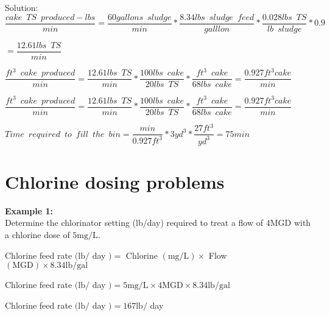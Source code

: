 \begin{enumerate}[1.]
Solution:\\
\vspace{0.2cm}
{$\dfrac{cake \enspace TS \enspace produced - lbs}{min}= \dfrac {60 gallons \enspace sludge}{min}*\dfrac {8.34 lbs \enspace sludge \enspace feed}{galllon}*\dfrac{0.028 lbs \enspace TS}{lb \enspace sludge}*0.9$}\\
\vspace{3mm}

{$=\dfrac{12.61lbs \enspace TS}{min}$}\\
\vspace{3mm}

{$\dfrac{ft^3 \enspace cake \enspace produced}{min}=\dfrac{12.61lbs \enspace TS}{min}*\dfrac{100 lbs \enspace cake}{20lbs \enspace TS}*\dfrac{ft^3 \enspace cake}{68 lbs \enspace cake} = \dfrac{0.927ft^3 cake}{min}$}\\
\vspace{3mm}

{$\dfrac{ft^3 \enspace cake \enspace produced}{min}=\dfrac{12.61lbs \enspace TS}{min}*\dfrac{100 lbs \enspace cake}{20lbs \enspace TS}*\dfrac{ft^3 \enspace cake}{68 lbs \enspace cake} = \dfrac{0.927ft^3 cake}{min}$}\\
\vspace{3mm}

{$Time \enspace required \enspace to \enspace fill \enspace the \enspace bin=\dfrac{min}{0.927ft^3}*{3yd^3}*\dfrac{27ft^3}{yd^3}=\boxed{75min}$}\\


\end{enumerate}

\section{Chlorine dosing problems}
\textbf{Example 1:}\\
Determine the chlorinator setting (lb/day) required to treat a flow of $4 \mathrm{MGD}$ with a chlorine dose of $5 \mathrm{mg} / \mathrm{L}$.

Chlorine feed rate $(\mathrm{lb} /$ day $)=$ Chlorine $(\mathrm{mg} / \mathrm{L}) \times$ Flow $(\mathrm{MGD}) \times 8.34 \mathrm{lb} / \mathrm{gal}$

Chlorine feed rate $(\mathrm{lb} /$ day $)=5 \mathrm{mg} / \mathrm{L} \times 4 \mathrm{MGD} \times 8.34 \mathrm{lb} / \mathrm{gal}$

Chlorine feed rate $(\mathrm{lb} /$ day $)=167 \mathrm{lb} /$ day

